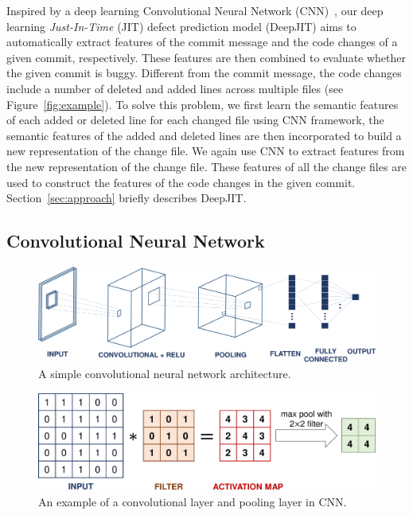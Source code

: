 Inspired by a deep learning Convolutional Neural Network (CNN)~\cite{lecun2015deep}, our deep learning \emph{Just-In-Time} (JIT) defect prediction model (DeepJIT) aims to automatically extract features of the commit message and the code changes of a given commit, respectively. These features are then combined to evaluate whether the given commit is buggy. 
Different from the commit message, the code changes include a number of deleted and added lines across multiple files (see Figure~\ref{fig:example}). To solve this problem, we first learn the semantic features of each added or deleted line for each changed file using CNN framework, the semantic features of the added and deleted lines are then incorporated to build a new representation 
of the change file. We again use CNN to extract features from the new representation of the change file. These features of all the change files are used to construct the features of the code changes in the given commit. Section~\ref{sec:approach} briefly describes DeepJIT. 

\subsection{Convolutional Neural Network}
\label{sec:background_cnn}

\begin{figure}[t!]
	\center
	\includegraphics[scale=0.3]{figs/cnn.pdf}
	\caption{A simple convolutional neural network architecture.}
	\label{fig:cnn}
\end{figure}

\begin{figure}[t!]
	\center
	\includegraphics[scale=0.3]{figs/filter_pooling.pdf}
	\caption{An example of a convolutional layer and pooling layer in CNN.}
	\label{fig:filter}
\end{figure}


